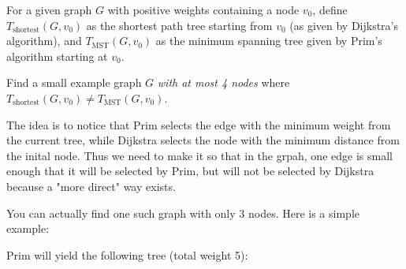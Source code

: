 \begin{prob}
    For a given graph $G$ with positive weights containing a node $v_0$, define $T_{\text{shortest}}(G, v_0)$ as the shortest path tree starting from $v_0$ (as given by Dijkstra's algorithm), and $T_{\text{MST}}(G, v_0)$ as the minimum spanning tree given by Prim's algorithm starting at $v_0$. 

    Find a small example graph $G$ \emph{with at most 4 nodes} where $T_{\text{shortest}}(G, v_0) \neq T_{\text{MST}}(G, v_0)$.
    \begin{soln}
        The idea is to notice that Prim selects the edge with the minimum weight from the current tree, while Dijkstra selects the node with the minimum distance from the inital node. 
        Thus we need to make it so that in the grpah, one edge is small enough that it will be selected by Prim, but will not be selected by Dijkstra because a "more direct" way exists.

        You can actually find one such graph with only 3 nodes. Here is a simple example:
    \begin{center}
    \end{center}

    Prim will yield the following tree (total weight 5): 

    \begin{center}
    \end{center}


\end{soln}
\end{prob}
